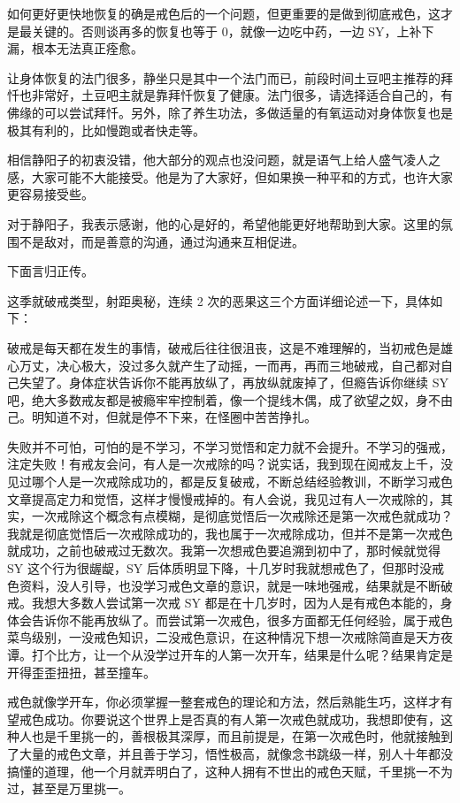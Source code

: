 \documentclass{ctexart}
\begin{document}
如何更好更快地恢复的确是戒色后的一个问题，但更重要的是做到彻底戒色，这才是最关键的。否则谈再多的恢复也等于 0，就像一边吃中药，一边 SY，上补下漏，根本无法真正痊愈。

让身体恢复的法门很多，静坐只是其中一个法门而已，前段时间土豆吧主推荐的拜忏也非常好，土豆吧主就是靠拜忏恢复了健康。法门很多，请选择适合自己的，有佛缘的可以尝试拜忏。另外，除了养生功法，多做适量的有氧运动对身体恢复也是极其有利的，比如慢跑或者快走等。

相信静阳子的初衷没错，他大部分的观点也没问题，就是语气上给人盛气凌人之感，大家可能不大能接受。他是为了大家好，但如果换一种平和的方式，也许大家更容易接受些。

对于静阳子，我表示感谢，他的心是好的，希望他能更好地帮助到大家。这里的氛围不是敌对，而是善意的沟通，通过沟通来互相促进。

下面言归正传。

这季就破戒类型，射距奥秘，连续 2 次的恶果这三个方面详细论述一下，具体如下：

破戒是每天都在发生的事情，破戒后往往很沮丧，这是不难理解的，当初戒色是雄心万丈，决心极大，没过多久就产生了动摇，一而再，再而三地破戒，自己都对自己失望了。身体症状告诉你不能再放纵了，再放纵就废掉了，但瘾告诉你继续 SY 吧，绝大多数戒友都是被瘾牢牢控制着，像一个提线木偶，成了欲望之奴，身不由己。明知道不对，但就是停不下来，在怪圈中苦苦挣扎。

失败并不可怕，可怕的是不学习，不学习觉悟和定力就不会提升。不学习的强戒，注定失败！有戒友会问，有人是一次戒除的吗？说实话，我到现在阅戒友上千，没见过哪个人是一次戒除成功的，都是反复破戒，不断总结经验教训，不断学习戒色文章提高定力和觉悟，这样才慢慢戒掉的。有人会说，我见过有人一次戒除的，其实，一次戒除这个概念有点模糊，是彻底觉悟后一次戒除还是第一次戒色就成功？我就是彻底觉悟后一次戒除成功的，我也属于一次戒除成功，但并不是第一次戒色就成功，之前也破戒过无数次。我第一次想戒色要追溯到初中了，那时候就觉得 SY 这个行为很龌龊，SY 后体质明显下降，十几岁时我就想戒色了，但那时没戒色资料，没人引导，也没学习戒色文章的意识，就是一味地强戒，结果就是不断破戒。我想大多数人尝试第一次戒 SY 都是在十几岁时，因为人是有戒色本能的，身体会告诉你不能再放纵了。而尝试第一次戒色，很多方面都无任何经验，属于戒色菜鸟级别，一没戒色知识，二没戒色意识，在这种情况下想一次戒除简直是天方夜谭。打个比方，让一个从没学过开车的人第一次开车，结果是什么呢？结果肯定是开得歪歪扭扭，甚至撞车。

戒色就像学开车，你必须掌握一整套戒色的理论和方法，然后熟能生巧，这样才有望戒色成功。你要说这个世界上是否真的有人第一次戒色就成功，我想即使有，这种人也是千里挑一的，善根极其深厚，而且前提是，在第一次戒色时，他就接触到了大量的戒色文章，并且善于学习，悟性极高，就像念书跳级一样，别人十年都没搞懂的道理，他一个月就弄明白了，这种人拥有不世出的戒色天赋，千里挑一不为过，甚至是万里挑一。
\end{document}
